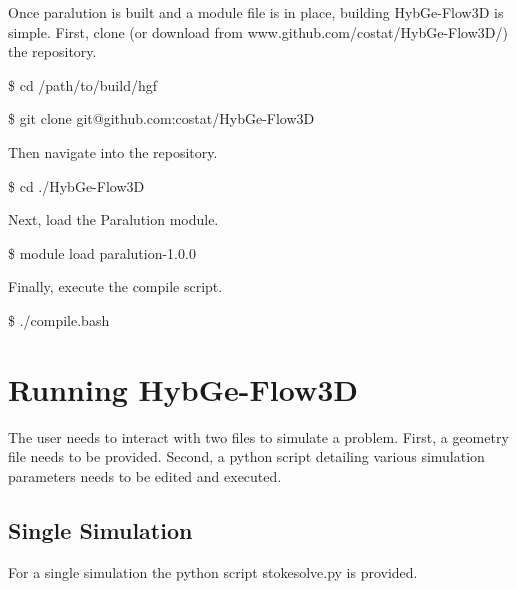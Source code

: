 \documentclass{report}
\begin{document}
Once paralution is built and a module file is in place, building
HybGe-Flow3D is simple.
First, clone (or download from www.github.com/costat/HybGe-Flow3D/) the repository.
\begin{mdframed}[style=MyFrame]
  \$ cd /path/to/build/hgf

  \noindent\$ git clone git@github.com:costat/HybGe-Flow3D
\end{mdframed}
Then navigate into the repository.
\begin{mdframed}[style=MyFrame]
  \$ cd ./HybGe-Flow3D
\end{mdframed}
Next, load the Paralution module.
\begin{mdframed}[style=MyFrame]
  \$ module load paralution-1.0.0
\end{mdframed}
Finally, execute the compile script.
\begin{mdframed}[style=MyFrame]
  \$ ./compile.bash
\end{mdframed}

\chapter{Running HybGe-Flow3D}

The user needs to interact with two files to simulate a problem.
First, a geometry file needs to be provided. Second, a python script
detailing various simulation parameters needs to be edited and executed.

\section{Single Simulation}

For a single simulation the python script stokesolve.py is provided.
\end{document}
